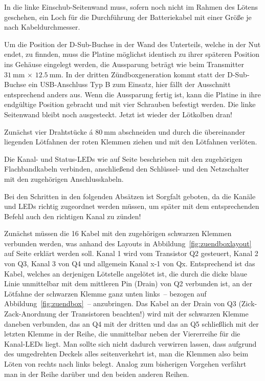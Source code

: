 \documentclass[paper=a4, parskip, numbers=noenddot, toc=listof, headsepline]{scrbook}
\begin{document}
				In die linke Einschub-Seitenwand muss, sofern noch nicht im Rahmen des Lötens geschehen, ein Loch für die Durchführung der Batteriekabel mit einer Größe je nach Kabeldurchmesser.

				Um die Position der D-Sub-Buchse in der Wand des Unterteils, welche in der Nut endet, zu finnden, muss die Platine möglichst identisch zu ihrer späteren Position ins Gehäuse eingelegt werden, die Aussparung beträgt wie beim Transmitter $\SI{31}{\milli\metre}\,\times\,\SI{12,5}{\milli\metre}$. In der dritten Zündboxgeneration kommt statt der D-Sub-Buchse ein USB-Anschluss Typ B zum Einsatz, hier fällt der Ausschnitt entsprechend anders aus. Wenn die Aussparung fertig ist, kann die Platine in ihre endgültige Position gebracht und mit vier Schrauben befestigt werden. Die linke Seitenwand bleibt noch ausgesteckt. Jetzt ist wieder der Lötkolben dran!

				Zunächst vier Drahtstücke á $\SI{80}{\milli\metre}$ abschneiden und durch die übereinander liegenden Lötfahnen der roten Klemmen ziehen und mit den Lötfahnen verlöten.

				Die Kanal- und Status-LEDs wie auf Seite \pageref{enum:leds} beschrieben mit den zugehörigen Flachbandkabeln verbinden, anschließend den Schlüssel- und den Netzschalter mit den zugehörigen Anschlusskabeln.

				Bei den Schritten in den folgenden Absätzen ist Sorgfalt geboten, da die Kanäle und LEDs richtig zugeordnet werden müssen, um später mit dem entsprechenden Befehl auch den richtigen Kanal zu zünden!

				Zunächst müssen die 16 Kabel mit den zugehörigen schwarzen Klemmen verbunden werden, was anhand des Layouts in Abbildung~\ref{fig:zuendboxlayout} auf Seite \pageref{fig:zuendboxlayout} erklärt werden soll. Kanal 1 wird vom Transistor Q2 gesteuert, Kanal 2 von Q3, Kanal 3 von Q4 und allgemein Kanal x-1 von Qx. Entsprechend ist das Kabel, welches an derjenigen Lötstelle angelötet ist, die durch die dicke blaue Linie unmittelbar mit dem mittleren Pin (Drain) von Q2 verbunden ist, an der Lötfahne der schwarzen Klemme ganz unten links~-- bezogen auf Abbildung~\ref{fig:zuendbox}~-- anzubringen. Das Kabel an der Drain von Q3 (Zick-Zack-Anordnung der Transistoren beachten!) wird mit der schwarzen Klemme daneben verbunden, das an Q4 mit der dritten und das an Q5 schließlich mit der letzten Klemme in der Reihe, die unmittelbar neben der Viererreihe für die Kanal-LEDs liegt. Man sollte sich nicht dadurch verwirren lassen, dass aufgrund des umgedrehten Deckels alles seitenverkehrt ist, man die Klemmen also beim Löten von rechts nach links belegt. Analog zum bisherigen Vorgehen verfährt man in der Reihe darüber und den beiden anderen Reihen.
\end{document}
